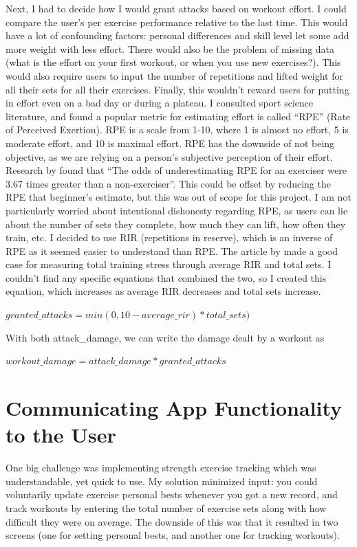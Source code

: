 \documentclass{l4proj}
\begin{document}
Next, I had to decide how I would grant attacks based on workout effort. I could compare the user's per exercise performance relative to the last time. This would have a lot of confounding factors: personal differences and skill level let some add more weight with less effort. There would also be the problem of missing data (what is the effort on your first workout, or when you use new exercises?). This would also require users to input the number of repetitions and lifted weight for all their sets for all their exercises. Finally, this wouldn't reward users for putting in effort even on a bad day or during a plateau. I consulted sport science literature, and found a popular metric for estimating effort is called ``RPE'' (Rate of Perceived Exertion). RPE is a scale from 1-10, where 1 is almost no effort, 5 is moderate effort, and 10 is maximal effort. RPE has the downside of not being objective, as we are relying on a person's subjective perception of their effort. Research by \citet{RPE_estimations} found that ``The odds of underestimating RPE for an exerciser were 3.67 times greater than a non-exerciser''. This could be offset by reducing the RPE that beginner's estimate, but this was out of scope for this project. I am not particularly worried about intentional dishonesty regarding RPE, as users can lie about the number of sets they complete, how much they can lift, how often they train, etc. I decided to use RIR (repetitions in reserve), which is an inverse of RPE as it seemed easier to understand than RPE. The article by \citet{rir} made a good case for measuring total training stress through average RIR and total sets. I couldn't find any specific equations that combined the two, so I created this equation, which increases as average RIR decreases and total sets increase.

\begin{algorithm}
  $granted\_attacks = min(0, 10 - average\_rir) * total\_sets)$
\end{algorithm}

With both attack\_damage, we can write the damage dealt by a workout as 

\begin{algorithm}
  $workout\_damage = attack\_damage * granted\_attacks$ 
\end{algorithm}


\section{Communicating App Functionality to the User}
One big challenge was implementing strength exercise tracking which was understandable, yet quick to use. My solution minimized input: you could voluntarily update exercise personal bests whenever you got a new record, and track workouts by entering the total number of exercise sets along with how difficult they were on average. The downside of this was that it resulted in two screens (one for setting personal bests, and another one for tracking workouts). 
\end{document}
